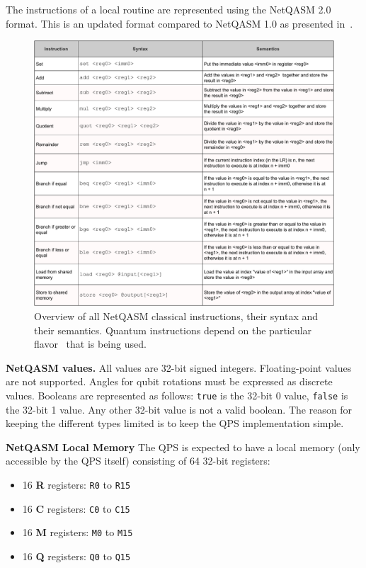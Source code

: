The instructions of a local routine are represented using the NetQASM 2.0 format.
This is an updated format compared to NetQASM 1.0 as presented in~\cite{dahlberg2022netqasm}.

\begin{figure}
    \centering
    \includegraphics[width=1.0\textwidth]{figures/qoala/netqasm_table.pdf}
    \caption{Overview of all NetQASM classical instructions, their syntax and their semantics.
    Quantum instructions depend on the particular flavor~\cite{dahlberg2022netqasm} that is being used.}
    \label{qoala:fig:app:netqasm_table}
\end{figure}


\textbf{NetQASM values.}
All values are 32-bit signed integers. Floating-point values are not supported. Angles for qubit rotations must be expressed as discrete values.
Booleans are represented as follows: \texttt{true} is the 32-bit 0 value, \texttt{false} is the 32-bit 1 value. Any other 32-bit value is not a valid boolean.
The reason for keeping the different types limited is to keep the QPS implementation simple.


\textbf{NetQASM Local Memory}
The QPS is expected to have a local memory (only accessible by the QPS itself) consisting of 64 32-bit registers:
\begin{itemize}
\item 16 \textbf{R} registers: \texttt{R0} to \texttt{R15}
\item 16 \textbf{C} registers: \texttt{C0} to \texttt{C15}
\item 16 \textbf{M} registers: \texttt{M0} to \texttt{M15}
\item 16 \textbf{Q} registers: \texttt{Q0} to \texttt{Q15}
\end{itemize}

